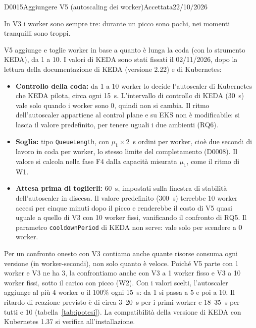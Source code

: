 \begin{decisione}{D0015}{Aggiungere V5 (autoscaling dei worker)}{Accettata}{22/10/2026}

\contesto
In V3 i worker sono sempre tre: durante un picco sono pochi, nei momenti tranquilli sono troppi.

\scelta
V5 aggiunge e toglie worker in base a quanto è lunga la coda (con lo strumento KEDA), da 1 a 10. I valori di KEDA sono stati fissati il 02/11/2026, dopo la lettura della documentazione di KEDA (versione 2.22) e di Kubernetes:
\begin{itemize}
  \item \textbf{Controllo della coda:} da 1 a 10 worker lo decide l'autoscaler di Kubernetes che KEDA pilota, circa ogni 15~s. L'intervallo di controllo di KEDA (30~s) vale solo quando i worker sono 0, quindi non si cambia. Il ritmo dell'autoscaler appartiene al control plane e su EKS non è modificabile: si lascia il valore predefinito, per tenere uguali i due ambienti (RQ6).
  \item \textbf{Soglia:} tipo \texttt{QueueLength}, con $\mu_1 \times 2$~s ordini per worker, cioè due secondi di lavoro in coda per worker, lo stesso limite del completamento (D0008). Il valore si calcola nella fase F4 dalla capacità misurata $\mu_1$, come il ritmo di W1.
  \item \textbf{Attesa prima di toglierli:} 60~s, impostati sulla finestra di stabilità dell'autoscaler in discesa. Il valore predefinito (300~s) terrebbe 10 worker accesi per cinque minuti dopo il picco e renderebbe il costo di V5 quasi uguale a quello di V3 con 10 worker fissi, vanificando il confronto di RQ5. Il parametro \texttt{cooldownPeriod} di KEDA non serve: vale solo per scendere a 0 worker.
\end{itemize}

\conseguenze
Per un confronto onesto con V3 contiamo anche quante risorse consuma ogni versione (in worker-secondi), non solo quanto è veloce. Poiché V5 parte con 1 worker e V3 ne ha 3, la confrontiamo anche con V3 a 1 worker fisso e V3 a 10 worker fissi, sotto il carico con picco (W2). Con i valori scelti, l'autoscaler aggiunge al più 4 worker o il 100\% ogni 15~s: da 1 si passa a 5 e poi a 10. Il ritardo di reazione previsto è di circa 3--20~s per i primi worker e 18--35~s per tutti e 10 (tabella~\ref{tab:ipotesi}). La compatibilità della versione di KEDA con Kubernetes 1.37 si verifica all'installazione.

\end{decisione}
